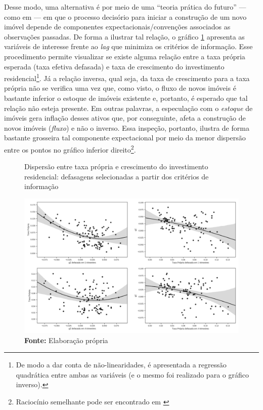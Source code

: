 Desse modo, uma alternativa é por meio de uma ``teoria prática do futuro'' --- como em \textcite[p.~214]{keynes_general_1937} --- em que o processo decisório para iniciar a construção de um novo imóvel depende de componentes expectacionais/convenções associados as observações passadas.
De forma a ilustrar tal relação, o gráfico \ref{defasagens} apresenta as variáveis de interesse frente ao \textit{lag} que minimiza os critérios de informação. Esse procedimento permite visualizar se existe alguma relação entre a taxa própria esperada (taxa efetiva defasada) e taxa de crescimento do investimento residencial\footnote{De modo a dar conta de não-linearidades, é apresentada a regressão quadrática entre ambas as variáveis (e o mesmo foi realizado para o gráfico inverso).}. Já a relação inversa, qual seja, da taxa de crescimento para a taxa própria não se verifica uma vez que, como visto, o fluxo de novos imóveis é bastante inferior o estoque de imóveis existente e, portanto, é esperado que tal relação não esteja presente. Em outras palavras, a especulação com o \textit{estoque}  de imóveis gera inflação desses ativos que, por conseguinte, afeta a construção de novos imóveis (\textit{fluxo}) e não o inverso. Essa inspeção, portanto, ilustra de forma bastante grosseira tal componente expectacional por meio da menor dispersão entre os pontos no gráfico inferior direito\footnote{Raciocínio semelhante pode ser encontrado em \textcite{girardi_autonomous_2015}}.  


\begin{figure}[htb]
	\centering
	\caption{Dispersão entre taxa própria e crescimento do investimento residencial: defasagens selecionadas a partir dos critérios de informação}
	\label{defasagens}
	\includegraphics[width=\textwidth]{../../Modelo/SeriesTemporais/figs/VEC_Defasagens.png}
	\caption*{\textbf{Fonte:} Elaboração própria}
\end{figure}


